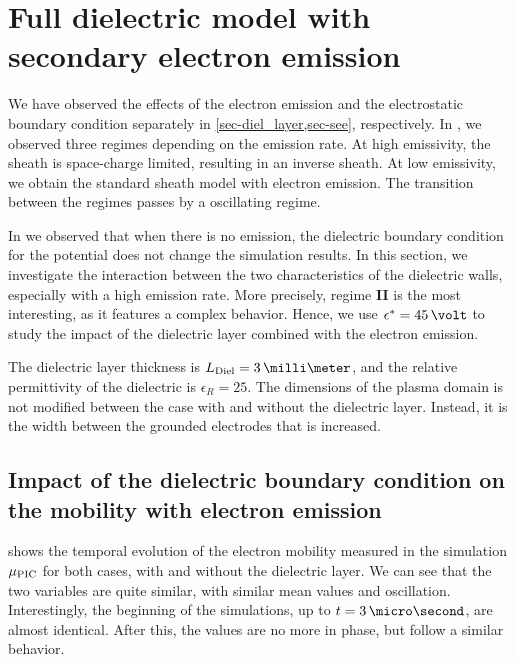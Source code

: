
\section{Full dielectric model with secondary electron emission}
  \label{sec-fulldiel}
  
  We have observed the effects of the electron emission and the electrostatic boundary condition separately in \cref{sec-diel_layer,sec-see}, respectively.  
  In , we observed three regimes depending on the emission rate.
  At high emissivity, the sheath is space-charge limited, resulting in an inverse sheath.
  At low emissivity, we obtain the standard sheath model with electron emission.
  The transition between the regimes passes by a oscillating regime.
  
  In  we observed that when there is no emission, the dielectric boundary condition for the potential does not change the simulation results.
  In this section, we investigate the interaction between the two characteristics of the dielectric walls, especially with a high emission rate.
  More precisely, regime {\bf II} is the most interesting, as it features a complex behavior.
  Hence, we use $\crover=45\,\volt$ to study the impact of the dielectric layer combined with the electron emission.
  
  The dielectric layer thickness is $L_{\rm Diel} = 3\,\milli\meter$, and the relative permittivity of the dielectric is $\epsilon_R=25$.
  The dimensions of the plasma domain is not modified between the case with and without the dielectric layer.
  Instead, it is the width between the grounded electrodes that is increased.
  
  \subsection{Impact of the dielectric boundary condition on the mobility with electron emission}
    
     shows the temporal evolution of the electron mobility measured in the simulation $\mu_{\mathrm{PIC}}$ for both cases, with and without the dielectric layer.
    We can see that the two variables are quite similar, with similar mean values and oscillation.
    Interestingly, the beginning of the simulations, up to $t=3\,\micro\second$, are almost identical.
    After this, the values are no more in phase, but follow a similar behavior.
    

